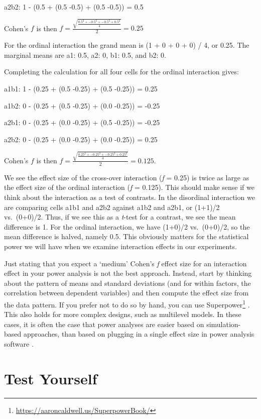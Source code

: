 \documentclass[
  oneside]{krantz}
\renewcommand{\href}[2]{#2\footnote{\url{#1}}}
\begin{document}
a2b2: 1 - (0.5 + (0.5 -0.5) + (0.5 -0.5)) = 0.5

Cohen's \(f\) is then \(f = \frac { \sqrt { \frac { 0.5^2 +-0.5^2 + -0.5^2 + 0.5^2 } { 4 } }}{ 2 } = 0.25\)

For the ordinal interaction the grand mean is (1 + 0 + 0 + 0) / 4, or 0.25. The marginal means are a1: 0.5, a2: 0, b1: 0.5, and b2: 0.

Completing the calculation for all four cells for the ordinal interaction gives:

a1b1: 1 - (0.25 + (0.5 -0.25) + (0.5 -0.25)) = 0.25

a1b2: 0 - (0.25 + (0.5 -0.25) + (0.0 -0.25)) = -0.25

a2b1: 0 - (0.25 + (0.0 -0.25) + (0.5 -0.25)) = -0.25

a2b2: 0 - (0.25 + (0.0 -0.25) + (0.0 -0.25)) = 0.25

Cohen's \(f\) is then \(f = \frac { \sqrt { \frac { 0.25^2 +-0.25^2 + -0.25^2 + 0.25^2 } { 4 } }}{ 2 } = 0.125\).

We see the effect size of the cross-over interaction (\emph{f} = 0.25) is twice as large as the effect size of the ordinal interaction (\emph{f} = 0.125). This should make sense if we think about the interaction as a test of contrasts. In the disordinal interaction we are comparing cells a1b1 and a2b2 against a1b2 and a2b1, or (1+1)/2 vs.~(0+0)/2. Thus, if we see this as a \emph{t}-test for a contrast, we see the mean difference is 1. For the ordinal interaction, we have (1+0)/2 vs.~(0+0)/2, so the mean difference is halved, namely 0.5. This obviously matters for the statistical power we will have when we examine interaction effects in our experiments.

Just stating that you expect a `medium' Cohen's \emph{f} effect size for an interaction effect in your power analysis is not the best approach. Instead, start by thinking about the pattern of means and standard deviations (and for within factors, the correlation between dependent variables) and then compute the effect size from the data pattern. If you prefer not to do so by hand, you can use \href{https://aaroncaldwell.us/SuperpowerBook/}{Superpower} \citep{lakens_simulation-based_2021}. This also holds for more complex designs, such as multilevel models. In these cases, it is often the case that power analyses are easier based on simulation-based approaches, than based on plugging in a single effect size in power analysis software \citep{debruine_understanding_2021}.

\hypertarget{test-yourself-4}{%
\section{Test Yourself}\label{test-yourself-4}}
\end{document}
